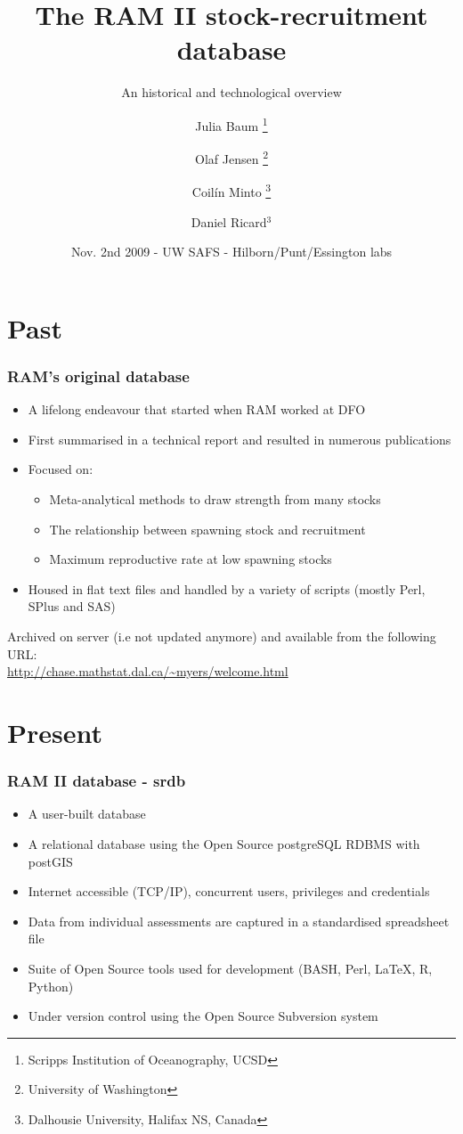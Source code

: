 \documentclass{beamer}
\title[Updated stock-recruitment DB]{The RAM II stock-recruitment database}
\subtitle{An historical and technological overview}
\author[Baum, Jensen, Minto and Ricard]{Julia Baum \thanks{Scripps Institution of Oceanography, UCSD} \and Olaf Jensen \thanks{University of Washington} \and Coil\'{i}n Minto \thanks{Dalhousie University, Halifax NS, Canada} \and Daniel Ricard$^{3}$}
\date{Nov. 2nd 2009 - UW SAFS - Hilborn/Punt/Essington labs}
\begin{document}
\frame{\titlepage}



\section{Past}

\begin{frame}
\frametitle{RAM's original database}

\begin{itemize}
 \item A lifelong endeavour that started when RAM worked at DFO
 \item First summarised in a technical report and resulted in numerous publications
 \item Focused on:
\begin{itemize}
 \item Meta-analytical methods to draw strength from many stocks
 \item The relationship between spawning stock and recruitment 
 \item Maximum reproductive rate at low spawning stocks
\end{itemize}
 \item Housed in flat text files and handled by a variety of scripts (mostly Perl, SPlus and SAS)
\end{itemize}

Archived on server (i.e not updated anymore) and available from the following URL:\\
\url{http://chase.mathstat.dal.ca/~myers/welcome.html}

\end{frame}


\section{Present}
\begin{frame}
\frametitle{RAM II database - srdb}
\begin{itemize}
 \item A user-built database
 \item A relational database using the Open Source postgreSQL RDBMS with postGIS
 \item Internet accessible (TCP/IP), concurrent users, privileges and credentials
 \item Data from individual assessments are captured in a standardised spreadsheet file
 \item Suite of Open Source tools used for development (BASH, Perl, LaTeX, R, Python)
 \item Under version control using the Open Source Subversion system

\end{itemize}

\end{frame}
\end{document}
